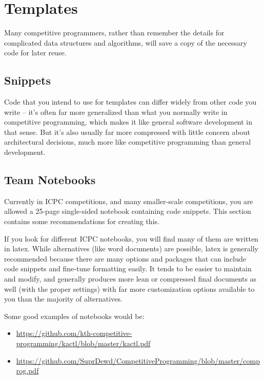\section{Templates}

Many competitive programmers, rather than remember the details for complicated data structures and algorithms, will save a copy of the necessary code for later reuse.

\subsection{Snippets}

Code that you intend to use for templates can differ widely from other code you write -- it's often far more generalized than what you normally write in competitive programming, which makes it like general software development in that sense. But it's also usually far more compressed with little concern about architectural decisions, much more like competitive programming than general development.

\subsection{Team Notebooks}
 

Currently in ICPC competitions, and many smaller-scale competitions, you are allowed a 25-page single-sided notebook containing code snippets. This section contains some recommendations for creating this.

If you look for different ICPC notebooks, you will find many of them are written in latex. While alternatives (like word documents) are possible, latex is generally recommended because there are many options and packages that can include code snippets and fine-tune formatting easily. It tends to be easier to maintain and modify, and generally produces more lean or compressed final documents as well (with the proper settings) with far more customization options available to you than the majority of alternatives.

Some good examples of notebooks would be:

\begin{itemize}
\item \url{https://github.com/kth-competitive-programming/kactl/blob/master/kactl.pdf}
\item \url{https://github.com/SuprDewd/CompetitiveProgramming/blob/master/comprog.pdf}
\end{itemize}
